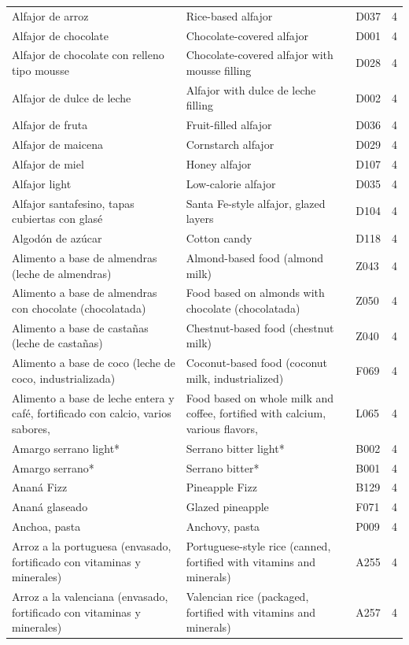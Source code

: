 {\begin{longtable}{p{4.3cm}p{5.5cm}p{1.5cm}p{0.7cm}}
Alfajor de arroz & Rice-based alfajor & D037 & 4\\
Alfajor de chocolate & Chocolate-covered alfajor & D001 & 4\\
Alfajor de chocolate con relleno tipo mousse & Chocolate-covered alfajor with mousse filling & D028 & 4\\
Alfajor de dulce de leche & Alfajor with dulce de leche filling & D002 & 4\\
Alfajor de fruta & Fruit-filled alfajor & D036 & 4\\
Alfajor de maicena & Cornstarch alfajor & D029 & 4\\
Alfajor de miel & Honey alfajor & D107 & 4\\
Alfajor light & Low-calorie alfajor & D035 & 4\\
Alfajor santafesino, tapas cubiertas con glasé & Santa Fe-style alfajor, glazed layers & D104 & 4\\
Algodón de azúcar & Cotton candy & D118 & 4\\
Alimento a base de almendras (leche de almendras) & Almond-based food (almond milk) & Z043 & 4\\
Alimento a base de almendras con chocolate (chocolatada) & Food based on almonds with chocolate (chocolatada) & Z050 & 4\\
Alimento a base de castañas (leche de castañas) & Chestnut-based food (chestnut milk) & Z040 & 4\\
Alimento a base de coco (leche de coco, industrializada) & Coconut-based food (coconut milk, industrialized) & F069 & 4\\
Alimento a base de leche entera y café, fortificado con calcio, varios sabores, & Food based on whole milk and coffee, fortified with calcium, various flavors, & L065 & 4\\
Amargo serrano light* & Serrano bitter light* & B002 & 4\\
Amargo serrano* & Serrano bitter* & B001 & 4\\
Ananá Fizz & Pineapple Fizz & B129 & 4\\
Ananá glaseado & Glazed pineapple & F071 & 4\\
Anchoa, pasta & Anchovy, pasta & P009 & 4\\
Arroz a la portuguesa (envasado, fortificado con vitaminas y minerales) & Portuguese-style rice (canned, fortified with vitamins and minerals) & A255 & 4\\
Arroz a la valenciana (envasado, fortificado con vitaminas y minerales) & Valencian rice (packaged, fortified with vitamins and minerals) & A257 & 4\\

\end{longtable}}
